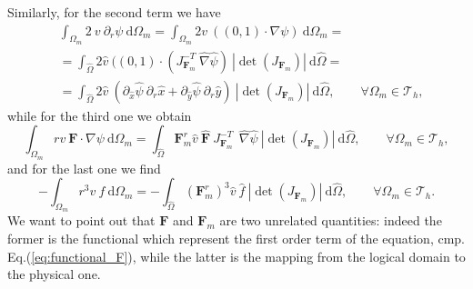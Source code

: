 Similarly, for the second term we have
\begin{equation}\label{eq:second_logical}
  \begin{split}
    &\int_{\Omega_m}2\:v\:\partial_r\psi\:\mathrm{d}\Omega_m =\int_{\Omega_m}2v\:((0,1)\cdot\nabla\psi)\:\mathrm{d}\Omega_m=\\
    &=\int_{\hat{\Omega}}2\hat{v}\:((0,1)\cdot(J_{\mathbf{F}_m}^{-T}\:\hat{\nabla}\hat{\psi})\:|\det(J_{\mathbf{F}_m})|\:\mathrm{d}\hat{\Omega}=\\
    &=\int_{\hat{\Omega}}2\hat{v}\:(\partial_{\hat{x}}\hat{\psi}\:\partial_r\hat{x}+\partial_{\hat{y}}\hat{\psi}\:\partial_r\hat{y})\:|\det(J_{\mathbf{F}_m})|\:\mathrm{d}\hat{\Omega},\qquad\forall\Omega_m\in\mathcal{T}_h,
  \end{split}
\end{equation}
while for the third one we obtain
\begin{equation}\label{eq:third_logical}
  \int_{\Omega_m}rv\:\mathbf{F}\cdot\nabla\psi\:\mathrm{d}\Omega_m = \int_{\hat{\Omega}}\mathbf{F}_m^r\hat{v}\:\mathbf{\hat{F}}\:J_{\mathbf{F}_m}^{-T}\:\:\hat{\nabla}\hat{\psi}\:|\det(J_{\mathbf{F}_m})|\:\mathrm{d}\hat{\Omega},\qquad\forall\Omega_m\in\mathcal{T}_h,
\end{equation}
and for the last one we find
\begin{equation}\label{eq:fourth_logical}
  -\int_{\Omega_m}r^3v\:f\:\mathrm{d}\Omega_m = -\int_{\hat{\Omega}}(\mathbf{F}_m^r)^3\hat{v}\:\hat{f}\:|\det(J_{\mathbf{F}_m})|\:\mathrm{d}\hat{\Omega},\qquad\forall\Omega_m\in\mathcal{T}_h.
\end{equation}
We want to point out that $\mathbf{F}$ and $\mathbf{F}_m$ are two unrelated quantities: indeed the former is the functional which represent the first order term of the equation, cmp. Eq.(\ref{eq:functional_F}), while the latter is the mapping from the logical domain to the physical one.
\medskip

